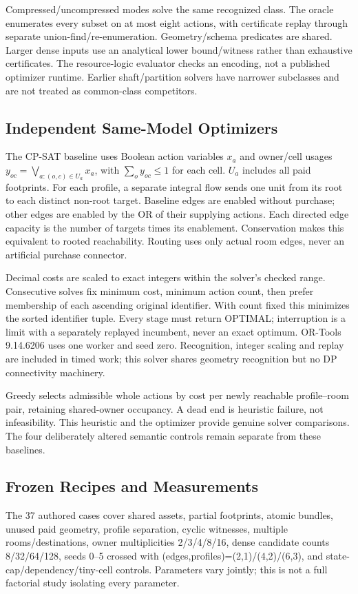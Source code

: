 \documentclass[conference]{IEEEtran}
\begin{document}
Compressed/uncompressed modes solve the same recognized class. The oracle enumerates every subset on at most eight actions, with certificate replay through separate union-find/re-enumeration. Geometry/schema predicates are shared. Larger dense inputs use an analytical lower bound/witness rather than exhaustive certificates. The resource-logic evaluator checks an encoding, not a published optimizer runtime. Earlier shaft/partition solvers have narrower subclasses and are not treated as common-class competitors.


\subsection{Independent Same-Model Optimizers}
The CP-SAT baseline \cite{cpsat} uses Boolean action variables $x_a$ and owner/cell usages $y_{oc}=\bigvee_{a:(o,c)\in U_a}x_a$, with $\sum_o y_{oc}\le1$ for each cell. $U_a$ includes all paid footprints. For each profile, a separate integral flow sends one unit from its root to each distinct non-root target. Baseline edges are enabled without purchase; other edges are enabled by the OR of their supplying actions. Each directed edge capacity is the number of targets times its enablement. Conservation makes this equivalent to rooted reachability. Routing uses only actual room edges, never an artificial purchase connector.

Decimal costs are scaled to exact integers within the solver's checked range. Consecutive solves fix minimum cost, minimum action count, then prefer membership of each ascending original identifier. With count fixed this minimizes the sorted identifier tuple. Every stage must return OPTIMAL; interruption is a limit with a separately replayed incumbent, never an exact optimum. OR-Tools 9.14.6206 uses one worker and seed zero. Recognition, integer scaling and replay are included in timed work; this solver shares geometry recognition but no DP connectivity machinery.

Greedy selects admissible whole actions by cost per newly reachable profile--room pair, retaining shared-owner occupancy. A dead end is heuristic failure, not infeasibility. This heuristic and the optimizer provide genuine solver comparisons. The four deliberately altered semantic controls remain separate from these baselines.

\subsection{Frozen Recipes and Measurements}
The 37 authored cases cover shared assets, partial footprints, atomic bundles, unused paid geometry, profile separation, cyclic witnesses, multiple rooms/destinations, owner multiplicities 2/3/4/8/16, dense candidate counts 8/32/64/128, seeds 0--5 crossed with (edges,profiles)=(2,1)/(4,2)/(6,3), and state-cap/dependency/tiny-cell controls. Parameters vary jointly; this is not a full factorial study isolating every parameter.
\end{document}
